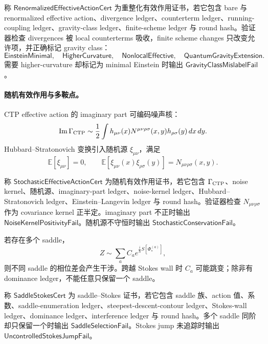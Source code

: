 \begin{definition}[重整化有效作用证书]\label{def:typed-address-biaxial-completion-renormalized-effective-action-cert}
称 \(\mathsf{RenormalizedEffectiveActionCert}\) 为重整化有效作用证书，若它包含 bare 与 renormalized effective action、divergence ledger、counterterm ledger、running-coupling ledger、gravity-class ledger、finite-scheme ledger 与 round hash。验证器检查 divergences 被 local counterterms 吸收，finite scheme changes 只改变允许项，并正确标记 gravity class：
\[
\mathsf{EinsteinMinimal},\quad
\mathsf{HigherCurvature},\quad
\mathsf{NonlocalEffective},\quad
\mathsf{QuantumGravityExtension}.
\]
需要 higher-curvature 却标记为 minimal Einstein 时输出 \(\mathsf{GravityClassMislabelFail}\)。
\end{definition}

\paragraph{随机有效作用与多鞍点。}
CTP effective action 的 imaginary part 可编码噪声核：
\[
{\rm Im}\,\Gamma_{\rm CTP}
\sim
\frac12
\int h_{\mu\nu}(x)N^{\mu\nu\rho\sigma}(x,y)h_{\rho\sigma}(y)\,dx\,dy.
\]
Hubbard--Stratonovich 变换引入随机源 \(\xi_{\mu\nu}\)，满足
\[
\mathbb E[\xi_{\mu\nu}]=0,\qquad
\mathbb E[\xi_{\mu\nu}(x)\xi_{\rho\sigma}(y)]
=
N_{\mu\nu\rho\sigma}(x,y).
\]

\begin{definition}[随机有效作用证书]\label{def:typed-address-biaxial-completion-stochastic-effective-action-cert}
称 \(\mathsf{StochasticEffectiveActionCert}\) 为随机有效作用证书，若它包含 \(\Gamma_{\rm CTP}\)、noise kernel、随机源、imaginary-part ledger、noise-kernel ledger、Hubbard--Stratonovich ledger、Einstein--Langevin ledger 与 round hash。验证器检查 \(N_{\mu\nu\rho\sigma}\) 作为 covariance kernel 正半定。imaginary part 不正时输出 \(\mathsf{NoiseKernelPositivityFail}\)。随机源不守恒时输出 \(\mathsf{StochasticConservationFail}\)。
\end{definition}

若存在多个 saddle，
\[
Z\sim\sum_a C_a e^{\frac{i}{\hbar}S[\Phi_\ast^{(a)}]},
\]
则不同 saddle 的相位差会产生干涉。跨越 Stokes wall 时 \(C_a\) 可能跳变；除非有 dominance ledger，不能任意只保留一个 saddle。

\begin{definition}\label{def:typed-address-biaxial-completion-saddle-stokes-cert}
称 \(\mathsf{SaddleStokesCert}\) 为 saddle--Stokes 证书，若它包含 saddle 族、action 值、系数、saddle-enumeration ledger、steepest-descent-contour ledger、Stokes-wall ledger、dominance ledger、interference ledger 与 round hash。多个 saddle 同阶却只保留一个时输出 \(\mathsf{SaddleSelectionFail}\)。Stokes jump 未追踪时输出 \(\mathsf{UncontrolledStokesJumpFail}\)。
\end{definition}

